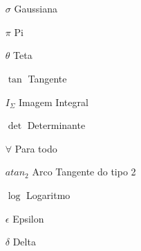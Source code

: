 \chapter*{\simbolosname}


\begin{itemize}
	\item[$ \sigma $] Gaussiana
	\item[$ \pi $] Pi
	\item[$ \theta  $] Teta
	\item[$ \tan $] Tangente
	\item[$  I_\Sigma  $] Imagem Integral
	\item[$ \det $] Determinante
	\item[$ \forall  $] Para todo
	\item[$ atan_2 $] Arco Tangente do tipo 2
	\item[$ \log $] Logaritmo
	\item[$ \epsilon $] Epsilon
	\item[$ \delta $] Delta
\end{itemize}